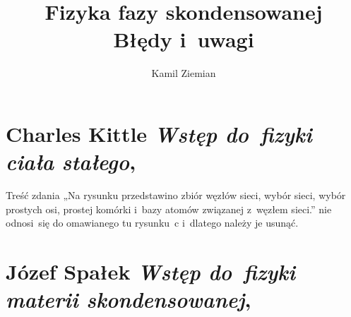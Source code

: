 \documentclass[a4paper,11pt]{article}
\title{Fizyka fazy skondensowanej \\
  {\Large Błędy i~uwagi}}
\author{Kamil Ziemian}
\numberwithin{equation}{section}
\begin{document}





\maketitle





\section{Charles Kittle \textit{Wstęp do~fizyki ciała
    stałego},
  \cite{Kittel-Wstep-do-fizyki-ciala-stalego-Pub-1976}}

\VerSpaceTwo




\vspace{0em}


\noindent
{} Treść zdania „Na rysunku przedstawino zbiór węzłów
sieci, wybór sieci, wybór prostych osi, prostej komórki i~bazy atomów
związanej z~węzłem sieci.” nie odnosi~się do omawianego tu rysunku~c
i~dlatego należy je usunąć.

\VerSpaceFour


















\section{Józef Spałek \textit{Wstęp do~fizyki materii
    skondensowanej},
  \cite{SpalekWstepDoFizykiMateriiSkondensowanej2015}}

\VerSpaceTwo

\vspace{0em}


\end{document}
